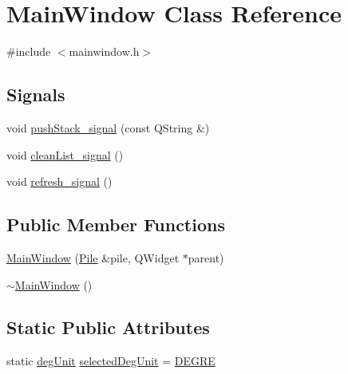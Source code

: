 \hypertarget{class_main_window}{\section{Main\-Window Class Reference}
\label{class_main_window}
}


{\ttfamily \#include $<$mainwindow.\-h$>$}

\subsection*{Signals}
\begin{DoxyCompactItemize}
\item 
void \hyperlink{class_main_window_a1e39eccc1e017799bda6b446b8280edf}{push\-Stack\-\_\-signal} (const Q\-String \&)
\item 
void \hyperlink{class_main_window_aed37073752de791b6ad06e41a8e9f1b2}{clean\-List\-\_\-signal} ()
\item 
void \hyperlink{class_main_window_a94d40675237489fc9d25ccc868a4dcbd}{refresh\-\_\-signal} ()
\end{DoxyCompactItemize}
\subsection*{Public Member Functions}
\begin{DoxyCompactItemize}
\item 
\hyperlink{class_main_window_ac8603055e732d11c01cfa8e44bff3ca2}{Main\-Window} (\hyperlink{class_pile}{Pile} \&pile, Q\-Widget $\ast$parent)
\item 
\hyperlink{class_main_window_ae98d00a93bc118200eeef9f9bba1dba7}{$\sim$\-Main\-Window} ()
\end{DoxyCompactItemize}
\subsection*{Static Public Attributes}
\begin{DoxyCompactItemize}
\item 
static \hyperlink{mainwindow_8h_a9a9c067334793a3ac24564d642912f95}{deg\-Unit} \hyperlink{class_main_window_afc05c1d46dbe05a4f21c57b4ed484a71}{selected\-Deg\-Unit} = \hyperlink{mainwindow_8h_a9a9c067334793a3ac24564d642912f95a389a4063677c2262f3a8060a641afd3f}{D\-E\-G\-R\-E}
\end{DoxyCompactItemize}


